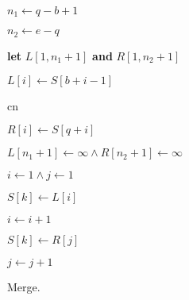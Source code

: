\documentclass[a4paper]{article}
\theoremstyle{plain}
\theoremstyle{definition}
\begin{document}
    \begin{algorithm}[H]
    \begin{algorithmic}[1]


        \State$n_{1}\leftarrow q-b+1$

    \State$n_{2}\leftarrow e-q$

        \State\textbf{let} $L\left[1,n_{1}+1\right]$\textbf{ and} $R\left[1,n_{2}+1\right]$


        \State$L\left[i\right]\leftarrow S\left[b+i-1\right]$

    \EndFor

    cn

        \State$R\left[i\right]\leftarrow S\left[q+i\right]$

    \EndFor

        \State$L\left[n_{1}+1\right]\leftarrow\infty\land R\left[n_{2}+1\right]\leftarrow\infty$

        \State$i\leftarrow1\land j\leftarrow1$



            \State$S\left[k\right]\leftarrow L\left[i\right]$

            \State$i\leftarrow i+1$

        \Else

            \State$S\left[k\right]\leftarrow R\left[j\right]$
        
            \State$j\leftarrow j+1$

        \EndIf

    \EndFor

    \EndProcedure

    \end{algorithmic}

    \caption{Merge.}
    \end{algorithm}
	
\end{document}
